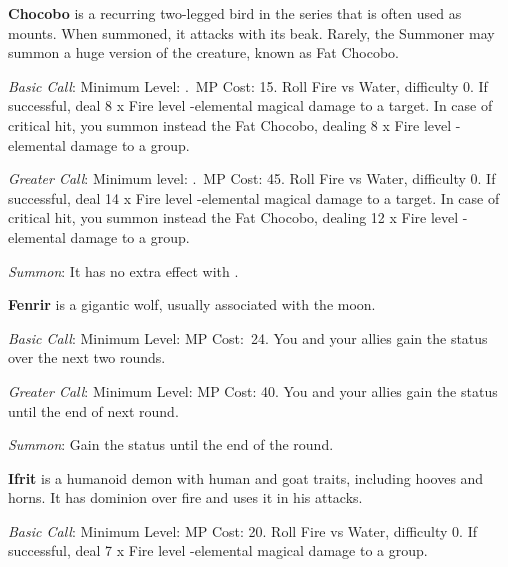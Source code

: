 \begin{multicols}{2}
    \ffcrystal[type=level,height=8pt]
    
    \textbf{Chocobo} is a recurring two-legged bird in the series that is often used as mounts. When summoned, it attacks with its beak. Rarely, the Summoner may summon a huge version of the creature, known as Fat Chocobo.

    \textit{Basic Call}: Minimum Level: .\ MP Cost: 15. Roll Fire vs Water, difficulty 0. If successful, deal 8 x Fire level -elemental magical damage to a target. In case of critical hit, you summon instead the Fat Chocobo, dealing 8 x Fire level -elemental damage to a group.
    
    \textit{Greater Call}: Minimum level: .\ MP Cost: 45. Roll Fire vs Water, difficulty 0. If successful, deal 14 x Fire level -elemental magical damage to a target. In case of critical hit, you summon instead the Fat Chocobo, dealing 12 x Fire level -elemental damage to a group.
    
	\textit{Summon}: It has no extra effect with .

    \ffcrystal[type=level,height=8pt]
    
    \textbf{Fenrir} is a gigantic wolf, usually associated with the moon.

	\textit{Basic Call}: Minimum Level:  MP Cost:\ 24. You and your allies gain the  status over the next two rounds.
    
    \textit{Greater Call}: Minimum Level:  MP Cost: 40. You and your allies gain the  status until the end of next round.
    
    \textit{Summon}: Gain the  status until the end of the round.

    \ffcrystal[type=level,height=8pt]

    \textbf{Ifrit} is a humanoid demon with human and goat traits, including hooves and horns. It has dominion over fire and uses it in his attacks.
    
    \textit{Basic Call}: Minimum Level:  MP Cost: 20. Roll Fire vs Water, difficulty 0. If successful, deal 7 x Fire level -elemental magical damage to a group.
    

\end{multicols}
